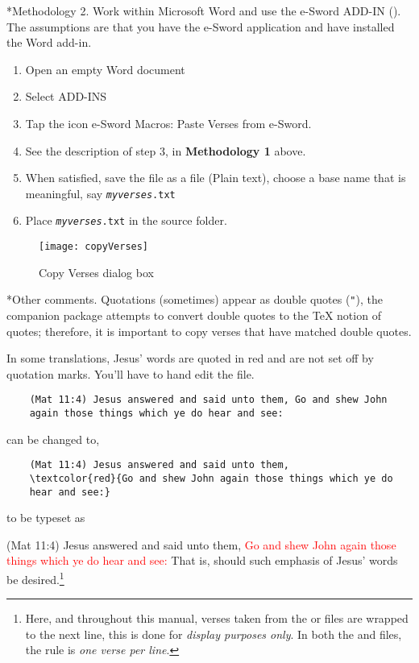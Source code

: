 \documentclass{article}
\makeatletter
\renewcommand*{\theparagraph}{\texorpdfstring{\protect\P\protect\ }{\textparagraph}}
\renewcommand{\paragraph}
    {\renewcommand{\@seccntformat}[1]{\theparagraph}%
    \@startsection{paragraph}{4}{0pt}{6pt}{-3pt}{\color{\aeb@subsubsectioncolor}\bfseries}}
\renewenvironment{quote}[1][]
   {\def\@rgi{#1}\ifx\@rgi\@empty
    \let\rghtm\@empty\else\def\rghtm{\rightmargin\leftmargin}\fi
    \list{}{\rghtm} %
    \item\relax}
   {\endlist}
\makeatother
\begin{document}
    \paragraph*{Methodology 2.} Work within \textsf{Microsoft Word} and use the
    \textsf{e-Sword} ADD-IN (). The
    assumptions are that you have the \textsf{e-Sword} application and have installed
    the \textsf{Word} add-in.
    \begin{enumerate}
    \item Open an empty Word document
    \item Select ADD-INS
    \item Tap the icon e-Sword Macros: Paste Verses from e-Sword.
    \item See the description of step 3, in \textbf{Methodology 1} above.
    \item When satisfied, save the file as a  file (Plain text), choose a
        base name that is meaningful, say \texttt{{\slshape{myverses}}.txt}
    \item Place \texttt{{\slshape{myverses}}.txt} in the source folder.
    \end{enumerate}

\begin{figure}[htb]\centering
  \texttt{[image: copyVerses]}
  \caption{\textsf{Copy Verses} dialog box}\label{fig:cpyVrs}
\end{figure}

    \paragraph*{Other comments.} Quotations (sometimes) appear as double quotes
    (\texttt{"}), the companion package  attempts to convert
    double quotes to the {\TeX} notion of quotes; therefore, it is important
    to copy verses that have matched double quotes.

    In some translations, Jesus' words are quoted in red and are not set off
    by quotation marks. You'll have to hand edit the  file.
\begin{Verbatim}
    (Mat 11:4) Jesus answered and said unto them, Go and shew John
    again those things which ye do hear and see:
\end{Verbatim}
    can be changed to,
\begin{Verbatim}
    (Mat 11:4) Jesus answered and said unto them,
    \textcolor{red}{Go and shew John again those things which ye do
    hear and see:}
\end{Verbatim}
to be typeset as
    \begin{quote}
    (Mat 11:4) Jesus answered and said unto them, \textcolor{red}{Go and shew John
    again those things which ye do hear and see:}
    \end{quote}
    That is, should such emphasis of Jesus' words be desired.\footnote{Here,
    and throughout this manual, verses taken from the  or 
    files are wrapped to the next line, this is done for \emph{display
    purposes only}. In both the  and  files, the rule is
    \emph{one verse per line}.}
\end{document}
